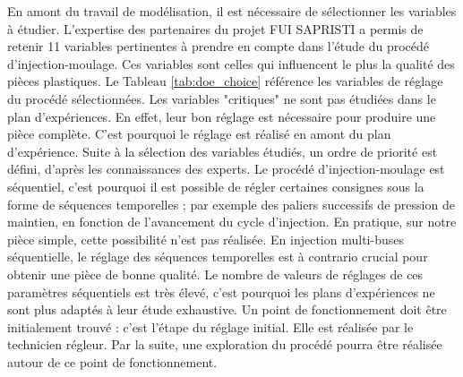 En amont du travail de modélisation, il est nécessaire de sélectionner les variables à étudier.
L'expertise des partenaires du projet FUI SAPRISTI a permis de retenir 11 variables pertinentes à prendre en compte dans l'étude du procédé d'injection-moulage.
Ces variables sont celles qui influencent le plus la qualité des pièces plastiques. Le Tableau \ref{tab:doe_choice} référence les variables de réglage du procédé sélectionnées.
Les variables "critiques" ne sont pas étudiées dans le plan d'expériences.
En effet, leur bon réglage est nécessaire pour produire une pièce complète.
C'est pourquoi le réglage est réalisé en amont du plan d'expérience.
Suite à la sélection des variables étudiés, un ordre de priorité est défini, d'après les connaissances des experts.
Le procédé d'injection-moulage est séquentiel, c'est pourquoi il est possible de régler certaines consignes sous la forme de séquences temporelles ; par exemple des paliers successifs de pression de maintien, en fonction de l'avancement du cycle d'injection.
En pratique, sur notre pièce simple, cette possibilité n'est pas réalisée.
En injection multi-buses séquentielle, le réglage des séquences temporelles est à contrario crucial pour obtenir une pièce de bonne qualité.
Le nombre de valeurs de réglages de ces paramètres séquentiels est très élevé, c'est pourquoi les plans d'expériences ne sont plus adaptés à leur étude exhaustive.
Un point de fonctionnement doit être initialement trouvé : c'est l'étape du réglage initial.
Elle est réalisée par le technicien régleur.
Par la suite, une exploration du procédé pourra être réalisée autour de ce point de fonctionnement.

